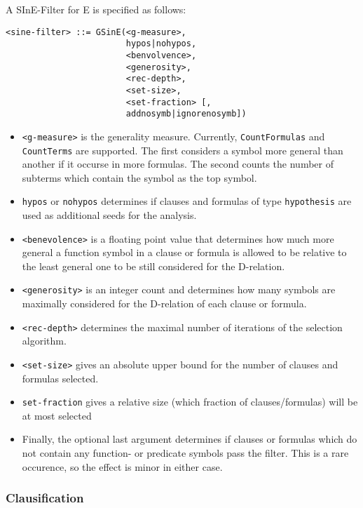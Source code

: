 \documentclass{report}
\begin{document}
\begin{itemize}
  A SInE-Filter for E is specified as follows:
\begin{verbatim}
<sine-filter> ::= GSinE(<g-measure>,
                        hypos|nohypos,
                        <benvolvence>,
                        <generosity>,
                        <rec-depth>,
                        <set-size>,
                        <set-fraction> [,
                        addnosymb|ignorenosymb])
\end{verbatim}
  \begin{itemize}
  \item \texttt{<g-measure>} is the generality measure. Currently,
    \texttt{CountFormulas} and \texttt{CountTerms} are supported. The
    first considers a symbol more general than another if it occurse
    in more formulas. The second counts the number of subterms which
    contain the symbol as the top symbol.
  \item \texttt{hypos} or \texttt{nohypos} determines if clauses and
    formulas of type \texttt{hy\-po\-the\-sis} are used as additional seeds
    for the analysis.
  \item \texttt{<benevolence>} is a floating point value that determines
    how much more general a function symbol in a clause or formula is
    allowed to be relative to the least general one to be still
    considered for the D-relation.
  \item \texttt{<generosity>} is an integer count and determines how
    many symbols are maximally considered for the D-relation of each
    clause or formula.
  \item \texttt{<rec-depth>} determines the maximal number of
    iterations of the selection algorithm.
  \item \texttt{<set-size>} gives an absolute upper bound for the
    number of clauses and formulas selected.
  \item \texttt{set-fraction} gives a relative size (which fraction
    of clauses/formulas) will be at most selected
  \item Finally, the optional last argument determines if clauses or
    formulas which do not contain any function- or predicate symbols
    pass the filter. This is a rare occurence, so the effect is minor
    in either case.
  \end{itemize}
\end{itemize}

\subsubsection{Clausification}
\label{sec:cnf}
\end{document}
